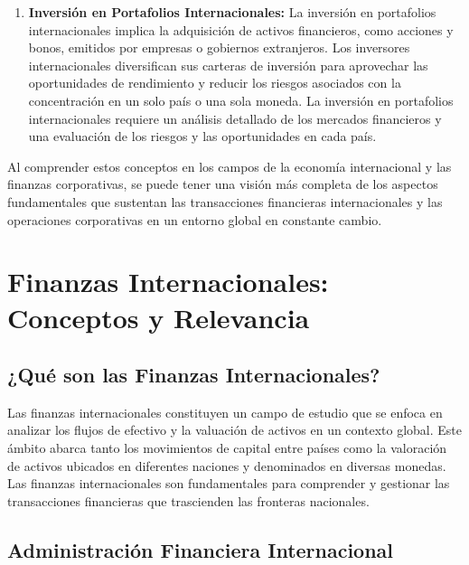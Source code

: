 \documentclass[
  jou,
  floatsintext,
  longtable,
  a4paper,
  nolmodern,
  notxfonts,
  notimes,
  12pt,
  colorlinks=true,linkcolor=blue,citecolor=blue,urlcolor=blue]{apa7}
\begin{document}
\begin{enumerate}
  emisión de acciones en los mercados de valores internacionales. El
  financiamiento internacional proporciona a las empresas los recursos
  necesarios para financiar sus operaciones y proyectos a nivel mundial.
\item
  \textbf{Inversión en Portafolios Internacionales:} La inversión en
  portafolios internacionales implica la adquisición de activos
  financieros, como acciones y bonos, emitidos por empresas o gobiernos
  extranjeros. Los inversores internacionales diversifican sus carteras
  de inversión para aprovechar las oportunidades de rendimiento y
  reducir los riesgos asociados con la concentración en un solo país o
  una sola moneda. La inversión en portafolios internacionales requiere
  un análisis detallado de los mercados financieros y una evaluación de
  los riesgos y las oportunidades en cada país.
\end{enumerate}

Al comprender estos conceptos en los campos de la economía internacional
y las finanzas corporativas, se puede tener una visión más completa de
los aspectos fundamentales que sustentan las transacciones financieras
internacionales y las operaciones corporativas en un entorno global en
constante cambio.

\section{Finanzas Internacionales: Conceptos y
Relevancia}\label{finanzas-internacionales-conceptos-y-relevancia}

\subsection{¿Qué son las Finanzas
Internacionales?}\label{quuxe9-son-las-finanzas-internacionales}

Las finanzas internacionales constituyen un campo de estudio que se
enfoca en analizar los flujos de efectivo y la valuación de activos en
un contexto global. Este ámbito abarca tanto los movimientos de capital
entre países como la valoración de activos ubicados en diferentes
naciones y denominados en diversas monedas. Las finanzas internacionales
son fundamentales para comprender y gestionar las transacciones
financieras que trascienden las fronteras nacionales.

\subsection{Administración Financiera
Internacional}\label{administraciuxf3n-financiera-internacional}
\end{document}
